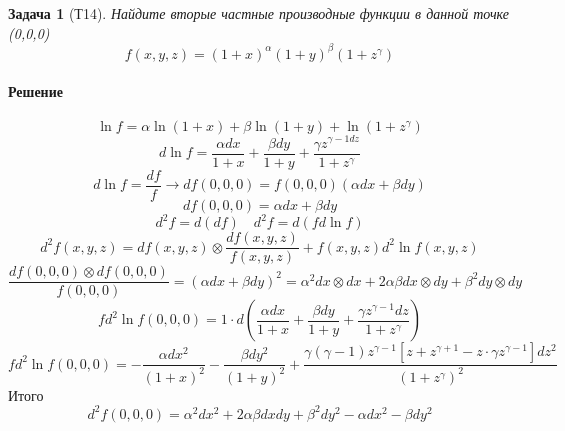 \documentclass[a4paper,12pt]{report}
\newtheorem{problem}{Задача}[]
\newenvironment{sol}{\paragraph{Решение}}{}
\begin{document}
    
    \begin{problem}[Т14]
        Найдите вторые частные производные функции в данной точке (0,0,0)
        \begin{equation*}
            f(x,y,z)=(1+x)^{\alpha}(1+y)^{\beta}(1+z^\gamma)
        \end{equation*}
    \end{problem}
    \begin{sol}
        \begin{equation*}
            \ln f =\alpha \ln(1+x) + \beta \ln(1+y)+\ln(1+z^\gamma)
        \end{equation*}
        \begin{equation*}
            d\ln f=\frac{\alpha dx}{1+x}+\frac{\beta dy}{1+y}+\frac{\gamma z^{\gamma-1dz}}{1+z^\gamma}
        \end{equation*}
        \begin{equation*}
            d\ln f=\frac{df}{f}\rightarrow df(0,0,0)=f(0,0,0)(\alpha dx+\beta dy)
        \end{equation*}
        \begin{equation}
            df(0,0,0)=\alpha dx+\beta dy
        \end{equation}
        \begin{equation*}
            d^2f=d(df) \quad d^2f=d(fd\ln f)
        \end{equation*}
        \begin{equation*}
            d^2f(x,y,z)=df(x,y,z)\otimes\frac{df(x,y,z)}{f(x,y,z)}+f(x,y,z)d^2\ln f(x,y,z)
        \end{equation*}
        \begin{equation*}
            \frac{df(0,0,0)\otimes df(0,0,0)}{f(0,0,0)}=(\alpha dx+\beta dy)^2=\alpha^2dx\otimes dx+2\alpha \beta dx\otimes dy+\beta^2dy\otimes dy
        \end{equation*}
        \begin{equation*}
            fd^2\ln f(0,0,0)=1\cdot d\left(\frac{\alpha dx}{1+x}+\frac{\beta dy}{1+y}+\frac{\gamma z^{\gamma-1}dz}{1+z^\gamma} \right)
        \end{equation*}
        \begin{equation*}
            fd^2\ln f(0,0,0)=-\frac{\alpha dx^2}{(1+x)^2}-\frac{\beta dy^2}{(1+y)^2}+\frac{\gamma (\gamma-1)z^{\gamma-1}[z+z^{\gamma+1}-z\cdot\gamma z^{\gamma-1}]dz^2}{(1+z^\gamma)^2}
        \end{equation*}
        Итого
        \begin{equation*}
            d^2f(0,0,0)=\alpha^2dx^2+2\alpha\beta dxdy+\beta^2dy^2-\alpha dx^2 -\beta dy^2
        \end{equation*}
    \end{sol}
	
\end{document}
